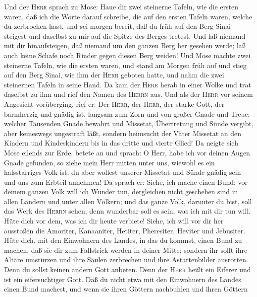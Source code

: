  Und der \textsc{Herr} sprach zu Mose: Haue dir zwei
steinerne Tafeln, wie die ersten waren, daß ich die Worte darauf
schreibe, die auf den ersten Tafeln waren, welche du zerbrochen hast,
 und sei morgen bereit, daß du früh auf den Berg Sinai
steigest und daselbst zu mir auf die Spitze des Berges tretest.
 Und laß niemand mit dir hinaufsteigen, daß niemand um den
ganzen Berg her gesehen werde; laß auch keine Schafe noch Rinder gegen
diesen Berg weiden!  Und Mose machte zwei steinerne
Tafeln, wie die ersten waren, und stand am Morgen früh auf und stieg auf
den Berg Sinai, wie ihm der \textsc{Herr} geboten hatte, und nahm die
zwei steinernen Tafeln in seine Hand.  Da kam der
\textsc{Herr} herab in einer Wolke und trat daselbst zu ihm und rief den
Namen des \textsc{Herrn} aus.  Und als der \textsc{Herr}
vor seinem Angesicht vorüberging, rief er: Der \textsc{Herr}, der
\textsc{Herr}, der starke Gott, der barmherzig und gnädig ist, langsam
zum Zorn und von großer Gnade und Treue;  welcher
Tausenden Gnade bewahrt und Missetat, Übertretung und Sünde vergibt,
aber keineswegs ungestraft läßt, sondern heimsucht der Väter Missetat an
den Kindern und Kindeskindern bis in das dritte und vierte Glied!
 Da neigte sich Mose eilends zur Erde, betete an und
sprach:  O Herr, habe ich vor deinen Augen Gnade gefunden,
so ziehe mein Herr mitten unter uns, wiewohl es ein halsstarriges Volk
ist; du aber wollest unserer Missetat und Sünde gnädig sein und uns zum
Erbteil annehmen!  Da sprach er: Siehe, ich mache einen
Bund: vor deinem ganzen Volk will ich Wunder tun, dergleichen nicht
geschehen sind in allen Ländern und unter allen Völkern; und das ganze
Volk, darunter du bist, soll das Werk des \textsc{Herrn} sehen; denn
wunderbar soll es sein, was ich mit dir tun will.  Hüte
dich vor dem, was ich dir heute verbiete! Siehe, ich will vor dir her
ausstoßen die Amoriter, Kanaaniter, Hetiter, Pheresiter, Heviter und
Jebusiter.  Hüte dich, mit den Einwohnern des Landes, in
das du kommst, einen Bund zu machen, daß sie dir zum Fallstrick werden
in deiner Mitte;  sondern ihr sollt ihre Altäre umstürzen
und ihre Säulen zerbrechen und ihre Astartenbilder ausrotten.
 Denn du sollst keinen andern Gott anbeten. Denn der
\textsc{Herr} heißt ein Eiferer und ist ein eifersüchtiger Gott.
 Daß du nicht etwa mit den Einwohnern des Landes einen
Bund machest, und wenn sie ihren Göttern nachbuhlen und ihren Göttern
